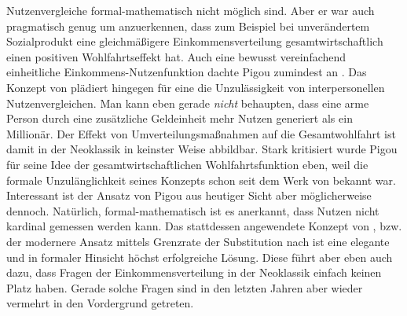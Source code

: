 Nutzenvergleiche formal-mathematisch nicht möglich sind. Aber er war auch pragmatisch genug um anzuerkennen, dass zum Beispiel bei unverändertem Sozialprodukt eine gleichmäßigere Einkommensverteilung gesamtwirtschaftlich einen positiven Wohlfahrtseffekt hat. Auch eine bewusst vereinfachend einheitliche Einkommens-Nutzenfunktion dachte Pigou zumindest an \parencite[S. 237]{Pigou1920}. Das Konzept von \textcite{Pareto1906} plädiert hingegen für eine die Unzulässigkeit von interpersonellen Nutzenvergleichen. Man kann eben gerade \textit{nicht} behaupten, dass eine arme Person durch eine zusätzliche Geldeinheit mehr Nutzen generiert als ein Millionär. Der Effekt von Umverteilungsmaßnahmen auf die Gesamtwohlfahrt ist damit in der Neoklassik in keinster Weise abbildbar. Stark kritisiert \parencite[S. 123]{Robbins1932} wurde Pigou für seine Idee der gesamtwirtschaftlichen Wohlfahrtsfunktion eben, weil die formale Unzulänglichkeit seines Konzepts schon seit dem Werk von \textcite{Pareto1906} bekannt war. Interessant ist der Ansatz von Pigou aus heutiger Sicht aber möglicherweise dennoch. Natürlich, formal-mathematisch ist es anerkannt, dass Nutzen nicht kardinal gemessen werden kann. Das stattdessen angewendete  Konzept von \textcite{Pareto1906}, bzw. der modernere Ansatz mittels Grenzrate der Substitution nach \textcite{Hicks1934b} ist eine elegante und in formaler Hinsicht höchst erfolgreiche Lösung. Diese führt aber eben auch dazu, dass Fragen der Einkommensverteilung in der Neoklassik einfach keinen Platz haben. Gerade solche Fragen sind in den letzten Jahren aber wieder vermehrt in den Vordergrund getreten.

